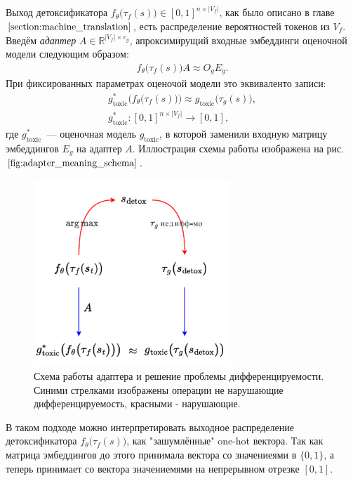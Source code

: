 Выход детоксификатора $f_{\theta}\bigl(\tau_{f}(s)\bigr) \in [0, 1]^{n \times |V_f|}$, как было описано в главе $\ref{section:machine_translation}$, есть распределение вероятностей токенов из $V_{f}$.
Введём \textit{адаптер} $A \in \mathbb{R}^{|V_f| \times e_{g}}$, апроксимирущий входные эмбеддинги оценочной модели следующим образом:
\begin{gather*}
    f_{\theta}\bigl(\tau_{f}(s)\bigr) A \approx O_{g} E_{g}.
\end{gather*}
При фиксированных параметрах оценочой модели это эквиваленто записи: 
\begin{gather*}
    g_{\text{toxic}}^{*} \bigl( f_{\theta}\bigl(\tau_{f}(s)\bigr)\bigr) 
    \approx g_{\text{toxic}} \bigl(\tau_{g} (s) \bigr), \\
    g_{\text{toxic}}^{*}: [0, 1]^{n \times |V_{f}|} \to [0, 1],
\end{gather*}
где $g_{\text{toxic}}^{*}$~--- оценочная модель $g_{\text{toxic}}$, в которой заменили входную матрицу эмбеддингов  $E_g$ на адаптер $A$.
Иллюстрация схемы работы изображена на рис. $\ref{fig:adapter_meaning_schema}$.
\begin{figure}[ht]
      \centering
      \includegraphics[width=0.66\textwidth]{images/non_diff_loss.pdf}
      \caption{
        Схема работы адаптера и решение проблемы дифференцируемости.
        Синими стрелками изображены операции не нарушающие  дифференцируемость, красными - нарушающие.
      }
      \label{fig:adapter_meaning_schema}
\end{figure}

В таком подходе можно интерпретировать выходное распределение детоксификатора $f_{\theta}\bigl(\tau_{f}(s)\bigr)$, как "зашумлённые" one-hot вектора.
Так как матрица эмбеддингов до этого принимала вектора со значениеями в $\{0, 1\}$, а теперь принимает со вектора значениемями на непрерывном отрезке $[0, 1]$.  


